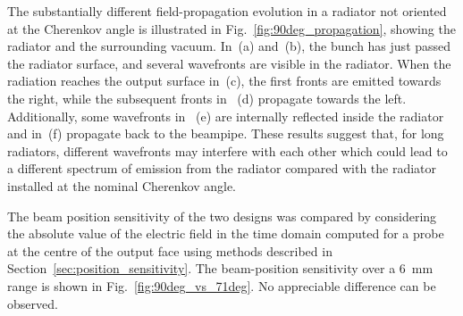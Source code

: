 The substantially different field-propagation evolution in a radiator not oriented at the Cherenkov angle is illustrated in Fig.~\ref{fig:90deg_propagation}, showing the radiator and the surrounding vacuum. In~(a) and~(b), the bunch has just passed the radiator surface, and several wavefronts are visible in the radiator. When the radiation reaches the output surface in~(c), the first fronts are emitted towards the right, while the subsequent fronts in ~(d) propagate towards the left. Additionally, some wavefronts in~ (e) are internally reflected inside the radiator and in~(f) propagate back to the beampipe. These results suggest that, for long radiators, different wavefronts may interfere with each other which could lead to a different spectrum of emission from the radiator compared with the radiator installed at the nominal Cherenkov angle. 

The beam position sensitivity of the two designs was compared by considering the absolute value of the electric field in the time domain computed for a probe at the centre of the output face using methods described in Section~\ref{sec:position_sensitivity}. The beam-position sensitivity over a 6~mm range is shown in Fig.~\ref{fig:90deg_vs_71deg}. No appreciable difference can be observed. 





